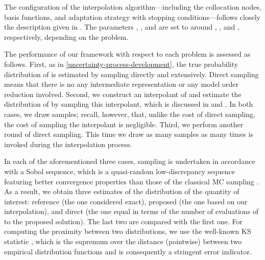 The configuration of the interpolation algorithm---including the collocation
nodes, basis functions, and adaptation strategy with stopping
conditions---follows closely the description given in .
The parameters , , and  are set to around
, , and , respectively, depending on the
problem.

The performance of our framework with respect to each problem is assessed as
follows. First, as in \cref{uncertainty-process-development}, the true
probability distribution of \g is estimated by sampling \g directly and
extensively. Direct sampling means that there is no any intermediate
representation or any model order reduction involved. Second, we construct an
interpolant of \g and estimate the distribution of \g by sampling this
interpolant, which is discussed in  and
. In both cases, we draw  samples; recall,
however, that, unlike the cost of direct sampling, the cost of sampling the
interpolant is negligible. Third, we perform another round of direct sampling.
This time we draw as many samples as many times \g is invoked during the
interpolation process.

In each of the aforementioned three cases, sampling is undertaken in accordance
with a Sobol sequence, which is a quasi-random low-discrepancy sequence
featuring better convergence properties than those of the classical \ac{MC}
sampling \cite{joe2008}. As a result, we obtain three estimates of the
distribution of the quantity of interest: reference (the one considered exact),
proposed (the one based on our interpolation), and direct (the one equal in
terms of the number of evaluations of \g to the proposed solution). The last two
are compared with the first one. For computing the proximity between two
distributions, we use the well-known \ac{KS} statistic \cite{rao2002}, which is
the supremum over the distance (pointwise) between two empirical distribution
functions and is consequently a stringent error indicator.


